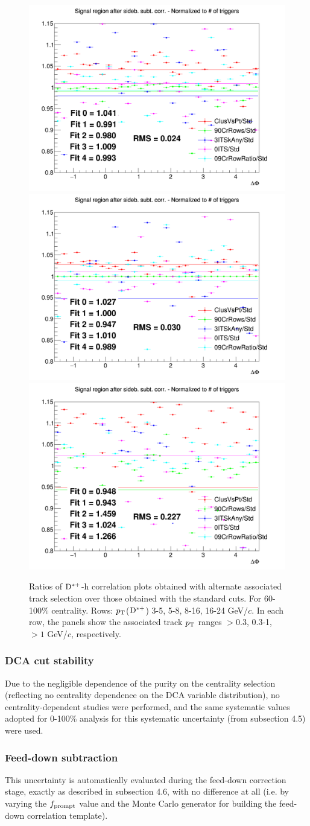 \begin{figure}
{\includegraphics[width=0.31\linewidth]{figuresVsCent/Dstar/SystTrackEff/AssTrackSyst_60100/Ratio_AzimCorrDistr_Dstar_Canvas_PtIntBins10to10_PoolInt_thr03to99_ASS_60100.png}}
{\includegraphics[width=0.31\linewidth]{figuresVsCent/Dstar/SystTrackEff/AssTrackSyst_60100/Ratio_AzimCorrDistr_Dstar_Canvas_PtIntBins10to10_PoolInt_thr03to1_ASS_60100.png}}
{\includegraphics[width=0.31\linewidth]{figuresVsCent/Dstar/SystTrackEff/AssTrackSyst_60100/Ratio_AzimCorrDistr_Dstar_Canvas_PtIntBins10to10_PoolInt_thr1to99_ASS_60100.png}} \\
 \caption{Ratios of ${\rm D^{*+}}$-h correlation plots obtained with alternate associated track selection over those obtained with the standard cuts. For 60-100\% centrality. Rows: $p_{\rm T}$(${\rm D^{*+}}$) 3-5, 5-8, 8-16, 16-24 GeV/$c$. In each row, the panels show the associated track
$p_{\rm T}$ ranges $> 0.3$, 0.3-1, $> 1$ GeV/$c$, respectively.}
\label{fig:SysTrEff60100_Dstar}
\end{figure}
\clearpage

\subsubsection{DCA cut stability}
Due to the negligible dependence of the purity on the centrality selection (reflecting no centrality dependence on the DCA variable  distribution), no centrality-dependent studies were performed, and the same systematic values adopted for 0-100\% analysis for this systematic uncertainty (from subsection 4.5) were used.

\subsubsection{Feed-down subtraction}
This uncertainty is automatically evaluated during the feed-down correction stage, exactly as described in subsection 4.6, with no difference at all (i.e. by varying the $f_{\rm prompt}$ value and the Monte Carlo generator for building the feed-down correlation template).

